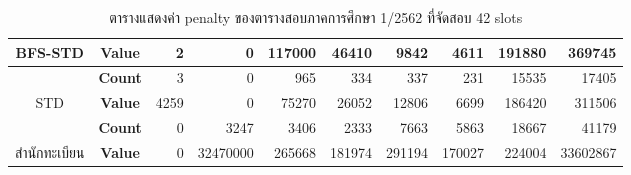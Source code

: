 \begin{table}[]
{\begin{tabular}{@{}ccrrrrrrrr@{}}
    \multirow{-2}{*}{BFS-STD}                    & \textbf{Value}                        & 2                           & 0                        & 117000                       & 46410                        & 9842                         & 4611                        & 191880                        & 369745                        \\ \midrule
    {\color[HTML]{FE0000} }                      & {\color[HTML]{FE0000} \textbf{Count}} & {\color[HTML]{FE0000} 3}    & {\color[HTML]{FE0000} 0} & {\color[HTML]{FE0000} 965}   & {\color[HTML]{FE0000} 334}   & {\color[HTML]{FE0000} 337}   & {\color[HTML]{FE0000} 231}  & {\color[HTML]{FE0000} 15535}  & {\color[HTML]{FE0000} 17405}  \\ \cmidrule(l){2-10} 
    \multirow{-2}{*}{{\color[HTML]{FE0000} STD}} & {\color[HTML]{FE0000} \textbf{Value}} & {\color[HTML]{FE0000} 4259} & {\color[HTML]{FE0000} 0} & {\color[HTML]{FE0000} 75270} & {\color[HTML]{FE0000} 26052} & {\color[HTML]{FE0000} 12806} & {\color[HTML]{FE0000} 6699} & {\color[HTML]{FE0000} 186420} & {\color[HTML]{FE0000} 311506} \\ \midrule
                                                 & \textbf{Count}                        & 0                           & 3247                     & 3406                         & 2333                         & 7663                         & 5863                        & 18667                         & 41179                         \\ \cmidrule(l){2-10} 
    \multirow{-2}{*}{สำนักทะเบียน}                  & \textbf{Value}                        & 0                           & 32470000                 & 265668                       & 181974                       & 291194                       & 170027                      & 224004                        & 33602867                      \\ \bottomrule
    \end{tabular}%
    }
    \caption{ตารางแสดงค่า penalty ของตารางสอบภาคการศึกษา 1/2562 ที่จัดสอบ 42 slots}
    \label{tab:result_table_162}
\end{table}
